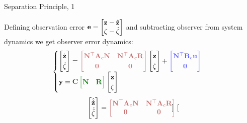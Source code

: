 \documentclass{beamer}
\begin{document}
\begin{frame}{Separation Principle, 1}
	\begin{flushleft}
		
		Defining observation error 
		$\mathbf{e} = 
		\begin{bmatrix}
			\mathbf{z} - \hat{\mathbf{z}} \\ \zeta - \hat{\zeta}
		\end{bmatrix}$
		and subtracting observer from system dynamics we get observer error dynamics:
		\begin{equation*}
			\begin{cases}
				\begin{bmatrix}
					\dot{\bo{z}} \\ \dot{\zeta}
				\end{bmatrix} =
				\textcolor{myred}
				{\begin{bmatrix}
					\bo{N}\T\bo{A}_c\bo{N} & \bo{N}\T\bo{A}_c\bo{R}\\ 
					\bo{0} & \bo{0}
				\end{bmatrix}}
				\begin{bmatrix}
					\bo{z} \\ \zeta
				\end{bmatrix}
				+
				\textcolor{myblue}
				{\begin{bmatrix}
					\bo{N}\T\bo{B}_c\bo{u} \\ \bo{0}
				\end{bmatrix}} \\
				\bo{y} = 
				\textcolor{mydarkgreen}
				{\bo{C} 
				\begin{bmatrix}
					\bo{N} & \bo{R}
				\end{bmatrix}}
				\begin{bmatrix}
					\bo{z} \\ \zeta
				\end{bmatrix}
			\end{cases}
		\end{equation*}
		\begin{equation*}
			\begin{bmatrix}
				\hat{\dot{\bo{z}}} \\ \dot{\hat{\zeta}}
			\end{bmatrix} =
		\textcolor{myred}
			{\begin{bmatrix}
				\bo{N}\T\bo{A}_c\bo{N} & \bo{N}\T\bo{A}_c\bo{R}\\ 
				\bo{0} & \bo{0}
			\end{bmatrix}}
			\begin{bmatrix}

\end{bmatrix}
\end{equation*}
\end{flushleft}
\end{frame}
\end{document}
